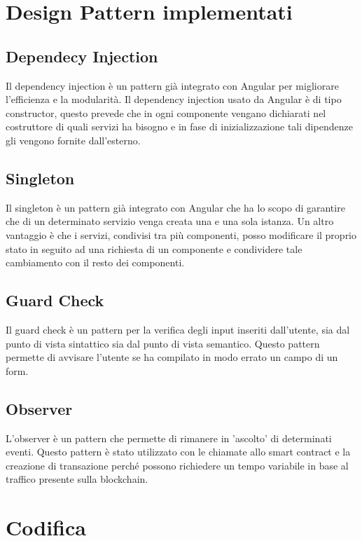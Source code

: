 
\section{Design Pattern implementati}

\subsection*{Dependecy Injection}
Il dependency injection è un pattern già integrato con Angular per migliorare l’efficienza e la modularità. Il dependency injection usato da Angular è di tipo constructor, questo prevede che in ogni componente vengano dichiarati nel costruttore di quali servizi ha bisogno e in fase di inizializzazione tali dipendenze gli vengono fornite dall’esterno.

\subsection*{Singleton}
Il singleton è un pattern già integrato con Angular che ha lo scopo di garantire che di un determinato servizio venga creata una e una sola istanza. Un altro vantaggio è che i servizi, condivisi tra più componenti, posso modificare il proprio stato in seguito ad una richiesta di un componente e condividere tale cambiamento con il resto dei componenti.

\subsection{Guard Check}
Il guard check è un pattern per la verifica degli input inseriti dall'utente, sia dal punto di vista sintattico sia dal punto di vista semantico. Questo pattern permette di avvisare l'utente se ha compilato in modo errato un campo di un form.

\subsection{Observer}
L’observer è un pattern che permette di rimanere in ’ascolto’ di determinati eventi. Questo pattern è stato utilizzato con le chiamate allo smart contract e la creazione di transazione perché possono richiedere un tempo variabile in base al traffico presente sulla blockchain.

\newpage
\section{Codifica}

